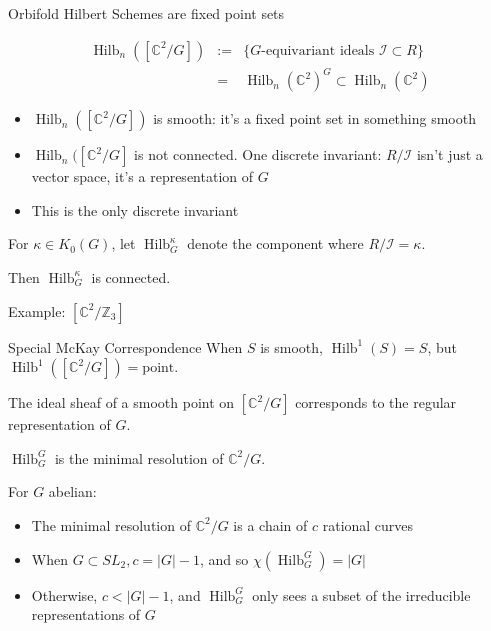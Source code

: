 \documentclass{beamer}
\DeclareMathOperator{\Hilb}{Hilb}
\newcommand{\C}{\mathbb{C}}
\newcommand{\Z}{\mathbb{Z}}
\begin{document}
\begin{frame}{Orbifold Hilbert Schemes are fixed point sets}


\begin{eqnarray*}
\Hilb_n([\C^2/G])&:=&\{\textrm{$G$-equivariant ideals } \mathcal{I}\subset R\} \\
&=&\Hilb_n(\C^2)^G\subset \Hilb_n(\C^2)
\end{eqnarray*}
\begin{itemize}
\item $\Hilb_n([\C^2/G])$ is smooth: it's a fixed point set in something smooth
\item $\Hilb_n([\C^2/G]$ is not connected.  One discrete invariant: $R/\mathcal{I}$ isn't just a vector space, it's a representation of $G$  
\item This is the only discrete invariant
\end{itemize}

For $\kappa\in K_0(G)$, let $\Hilb^\kappa_G$ denote the component where $R/\mathcal{I}=\kappa$.

Then $\Hilb^\kappa_G$ is connected.
\end{frame}

\begin{frame}[plain, c]

\begin{center}

\Huge

Example: $[\C^2/\Z_3]$
 \end{center}

\end{frame}







\begin{frame}{Special McKay Correspondence}
When $S$ is smooth, $\Hilb^1(S)=S$,  but $\Hilb^1([\C^2/G])=\textrm{point}$.

The ideal sheaf of a smooth point on $[\C^2/G]$ corresponds to the regular representation of $G$.

\begin{theorem}
$\Hilb_G^G$ is the minimal resolution of $\C^2/G$.
\end{theorem}
For $G$ abelian:
\begin{itemize}
\item The minimal resolution of $\C^2/G$ is a chain of $c$ rational curves
\item When $G\subset SL_2, c=|G|-1$, and so $\chi(\Hilb_G^G)=|G|$
\item Otherwise, $c<|G|-1$, and $\Hilb_G^G$ only sees a subset of the irreducible representations of $G$
\end{itemize}

\end{frame}
\end{document}
